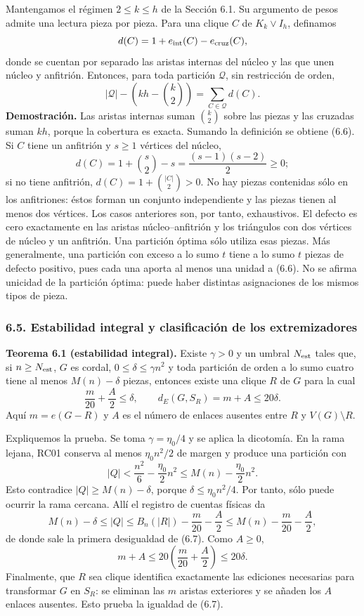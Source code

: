 \documentclass[spanish,11pt,a4paper]{article}
\begin{document}
Mantengamos el régimen \(2\le k\le h\) de la Sección 6.1. Su argumento de pesos admite una lectura pieza por pieza. Para una clique \(C\) de \(K_k\vee I_h\), definamos \[
d(C)=1+e_{\rm int}(C)-e_{\rm cruz}(C),
\] donde se cuentan por separado las aristas internas del núcleo y las que unen núcleo y anfitrión. Entonces, para toda partición \(\mathcal Q\), sin restricción de orden, \[
|\mathcal Q|-\left(kh-\binom k2\right)
=\sum_{C\in\mathcal Q}d(C).
\tag{6.6}
\] \textbf{Demostración.} Las aristas internas suman \(\binom k2\) sobre las piezas y las cruzadas suman \(kh\), porque la cobertura es exacta. Sumando la definición se obtiene (6.6). Si \(C\) tiene un anfitrión y \(s\ge1\) vértices del núcleo, \[
d(C)=1+\binom s2-s=\frac{(s-1)(s-2)}2\ge0;
\] si no tiene anfitrión, \(d(C)=1+\binom{|C|}2>0\). No hay piezas contenidas sólo en los anfitriones: éstos forman un conjunto independiente y las piezas tienen al menos dos vértices. Los casos anteriores son, por tanto, exhaustivos. El defecto es cero exactamente en las aristas núcleo--anfitrión y los triángulos con dos vértices de núcleo y un anfitrión. Una partición óptima sólo utiliza esas piezas. Más generalmente, una partición con exceso a lo sumo \(t\) tiene a lo sumo \(t\) piezas de defecto positivo, pues cada una aporta al menos una unidad a (6.6). No se afirma unicidad de la partición óptima: puede haber distintas asignaciones de los mismos tipos de pieza.


\subsubsection{6.5. Estabilidad integral y clasificación de los extremizadores}\label{estabilidad-integral-y-clasificaciuxf3n-de-los-extremizadores}


\textbf{Teorema 6.1 (estabilidad integral).} Existe \(\gamma>0\) y un umbral \(N_{\rm est}\) tales que, si \(n\ge N_{\rm est}\), \(G\) es cordal, \(0\le\delta\le\gamma n^2\) y toda partición de orden a lo sumo cuatro tiene al menos \(M(n)-\delta\) piezas, entonces existe una clique \(R\) de \(G\) para la cual \[
\frac m{20}+\frac A2\le\delta,
\qquad
d_E(G,S_R)=m+A\le20\delta.
\tag{6.7}
\] Aquí \(m=e(G-R)\) y \(A\) es el número de enlaces ausentes entre \(R\) y \(V(G)\setminus R\).

Expliquemos la prueba. Se toma \(\gamma=\eta_0/4\) y se aplica la dicotomía. En la rama lejana, RC01 conserva al menos \(\eta_0n^2/2\) de margen y produce una partición con \[
|Q|<\frac{n^2}{6}-\frac{\eta_0}{2}n^2
\le M(n)-\frac{\eta_0}{2}n^2.
\] Esto contradice \(|Q|\ge M(n)-\delta\), porque \(\delta\le\eta_0n^2/4\). Por tanto, sólo puede ocurrir la rama cercana. Allí el registro de cuentas físicas da \[
M(n)-\delta\le |Q|
\le B_n(|R|)-\frac m{20}-\frac A2
\le M(n)-\frac m{20}-\frac A2,
\] de donde sale la primera desigualdad de (6.7). Como \(A\ge0\), \[
m+A\le20\left(\frac m{20}+\frac A2\right)\le20\delta.
\] Finalmente, que \(R\) sea clique identifica exactamente las ediciones necesarias para transformar \(G\) en \(S_R\): se eliminan las \(m\) aristas exteriores y se añaden los \(A\) enlaces ausentes. Esto prueba la igualdad de (6.7).
\end{document}
